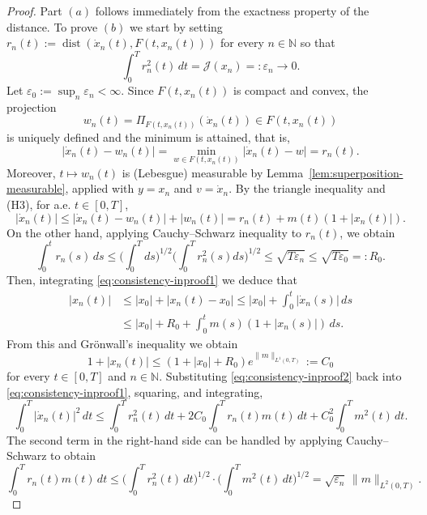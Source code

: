 \documentclass[11pt]{elsarticle}
\theoremstyle{definition}
\theoremstyle{remark}
\numberwithin{equation}{section}
\begin{document}
	\begin{proof}
		Part $(a)$ follows immediately from the exactness property of the distance. To prove $(b)$ we start by setting $r_n(t) := \operatorname{dist}(\dot{x}_n(t), F(t, x_n(t)))$ for every $n\in\mathbb{N}$ so that
		\[
		\int_0^T r_n^2(t) \, dt = \mathcal{J}(x_n) =: \varepsilon_n \to 0.
		\]
		Let $\varepsilon_0 := \sup_n \varepsilon_n < \infty$. Since  $F(t, x_n(t))$ is  compact and convex, the projection
		\[
		w_n(t) = \Pi_{F(t, x_n(t))}(\dot{x}_n(t)) \in F(t, x_n(t))
		\]
		is uniquely defined and the minimum is attained, that is,
		\[
		|\dot{x}_n(t) - w_n(t)| =\min_{w\in F(t, x_n(t))} |\dot{x}_n(t) - w| =r_n(t).
		\]
		Moreover, $t\mapsto w_n(t)$ is (Lebesgue) measurable by
		Lemma~\ref{lem:superposition-measurable}, applied with $y=x_n$ and
		$v=\dot{x}_n$.
		By the triangle inequality and (H3), for a.e. $t\in[0,T]$,
		\begin{equation}\label{eq:consistency-inproof1}
			|\dot{x}_n(t)| \le |\dot{x}_n(t) - w_n(t)|+|w_n(t)|= r_n(t) + m(t)(1 + |x_n(t)|).
		\end{equation}
		On the other hand, applying Cauchy–Schwarz inequality to $r_n(t)$, we obtain 
		\[
		\int_0^t r_n(s) \, ds  \le \Big(\int_0^T ds\Big)^{1/2}\Big(\int_0^T r^2_n(s)ds\Big)^{1/2}
		\leq  \sqrt{T \varepsilon_n}\le  \sqrt{T \varepsilon_0} =: R_0.
		\]
		Then, integrating \eqref{eq:consistency-inproof1} we deduce that
		\begin{align}
			|x_n(t)| & \le |x_0|  + |x_n(t)-x_0|
			\leq |x_0| + \int_0^t |\dot{x}_n(s)|\, ds
			\nonumber\\ & 
			\le |x_0| + R_0 + \int_0^t m(s)(1 + |x_n(s)|) \, ds.
			\nonumber
		\end{align}
		From this and Gr\"{o}nwall's inequality we obtain
		\begin{equation}\label{eq:consistency-inproof2}
			1 + |x_n(t)| \le (1 + |x_0| + R_0 )e^{\|m\|_{L^1(0,T)}}:=C_0
		\end{equation}
		for every $t \in [0,T]$ and $n\in\mathbb{N}$.
		Substituting \eqref{eq:consistency-inproof2} back into \eqref{eq:consistency-inproof1}, squaring, and integrating,
		\[
		\int_0^T |\dot{x}_n(t)|^2 \, dt \le \int_0^T r_n^2(t) \, dt + 2C_0 \int_0^T r_n(t) m(t) \, dt 
		+ C_0^2 \int_0^T m^2(t) \, dt.
		\]
		The second term in the right-hand side can be handled by
		applying Cauchy--Schwarz to obtain
		\[
		\int_0^T r_n(t) m(t) \, dt \le \Big(\int_0^T r_n^2(t) \, dt\Big)^{1/2} \cdot \Big(\int_0^T m^2(t) \, dt \Big)^{1/2} 
		= \sqrt{\varepsilon_n} \, \|m\|_{L^2(0,T)}.
\]
\end{proof}
\end{document}

